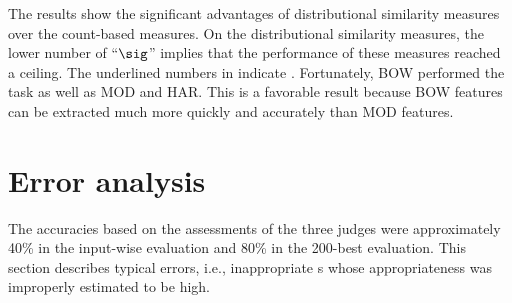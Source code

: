 \documentclass[english]{jnlp_1.4}
\begin{document}
The results show the significant advantages of distributional
similarity measures over the count-based measures.  On the
distributional similarity measures, the lower number of ``$\sig$''
implies that the performance of these measures reached a ceiling.
The underlined numbers in  indicate {\compfeat}.
Fortunately, BOW performed the task as well as MOD and HAR.  This is a
favorable result because BOW features can be extracted much more
quickly and accurately than MOD features.




\section{Error analysis}
\label{sec:errors}

The accuracies based on the assessments of the three judges were
approximately 40\% in the input-wise evaluation and 80\% in the
200-best evaluation.
This section describes typical errors, i.e., inappropriate {\pcp}s
whose appropriateness was improperly estimated to be high.
\end{document}
